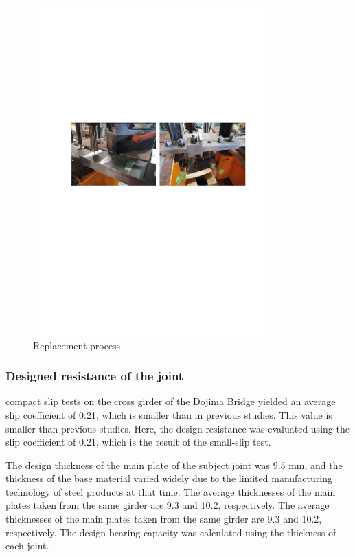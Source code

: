 \begin{figure}[htbp]
    \centering
    \includegraphics[width=0.8\textwidth]{imgs/ch3/reproce.pdf}
    \caption{Replacement process}
    \label{fig-reproce}
\end{figure}

\subsubsection{Designed resistance of the joint}

compact slip tests on the cross girder of the Dojima Bridge yielded an average slip coefficient of 0.21, which is smaller than in previous studies. This value is smaller than previous studies. Here, the design resistance was evaluated using the slip coefficient of 0.21, which is the result of the small-slip test.

The design thickness of the main plate of the subject joint was 9.5 mm, and the thickness of the base material varied widely due to the limited manufacturing technology of steel products at that time. The average thicknesses of the main plates taken from the same girder are 9.3 and 10.2, respectively.
The average thicknesses of the main plates taken from the same girder are 9.3 and 10.2, respectively. The design bearing capacity was calculated using the thickness of each joint.

